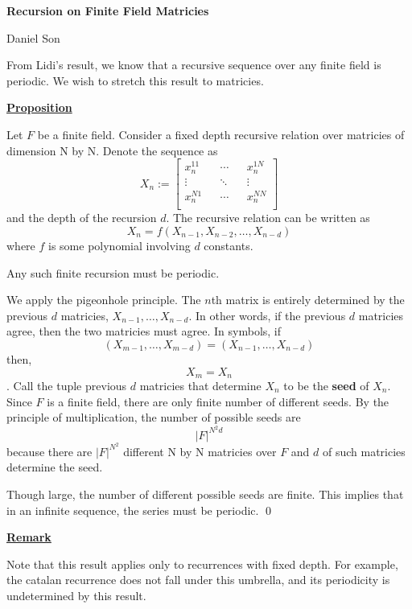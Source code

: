 \documentclass{article}
\newcommand{\new}[1]{
    \vspace{2mm}
    \noindent
    \textbf{
    \underline{#1}}
}
\begin{document}
\begin{center}
    \Large
    \textbf{Recursion on Finite Field Matricies}

    \large
    Daniel Son
\end{center}

From Lidi's result, we know that a recursive sequence over 
any finite field is periodic. We wish to stretch this result 
to matricies. 

\new{Proposition}
Let $F$ be a finite field. Consider a fixed depth recursive relation 
over matricies of dimension N by N. Denote the sequence as 
\[
    X_n := 
    \begin{bmatrix}
        x_n^{11}  && \cdots && x_n^{1N} \\ 
        \vdots && \ddots && \vdots \\ 
        x_n^{N1}  && \cdots && x_n^{NN} \\ 
    \end{bmatrix}
\]
and the depth of the recursion $d$. The recursive relation 
can be written as 
\[
    X_{n} = f(X_{n - 1}, X_{n - 2}, \dots , X_{n - d})
\]   
where $f$ is some polynomial involving $d$ constants. 

Any such finite recursion must be periodic. 

\proof 
We apply the pigeonhole principle. The $n$th matrix is 
entirely determined by the previous $d$ matricies, 
$X_{n -1}, \dots, X_{n - d}$. 
In other words, if the previous $d$ matricies agree, 
then the two matricies must agree.  
In symbols, if
\[
    (X_{m -1}, \dots, X_{m - d}) =  (X_{n -1}, \dots, X_{n - d})
\]
then,
\[
    X_m = X_n
\]. 
Call the tuple previous $d$ matricies that determine $X_n$ to be 
the \textbf{seed} of $X_n$. 
Since $F$ is a finite field, there are only finite number of different 
seeds. By the principle of multiplication, the number of possible seeds 
are 
\[
    |F|^{N^2 d}
\]  
because there are $|F|^{N^2}$ different N by N matricies over $F$ and 
$d$ of such matricies determine the seed. 

Though large, the number of different possible seeds are finite. 
This implies that in an infinite sequence, the series must be periodic.
\hfill \qed 

\new{Remark}
Note that this result applies only to recurrences with fixed depth. 
For example, the catalan recurrence does not fall under this umbrella, 
and its periodicity is undetermined by this result. 
\end{document}
